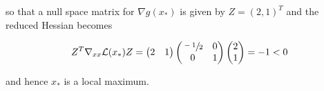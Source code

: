 \begin{solution}
    so that a null space matrix for $\nabla g(x_*)$ is given by $Z = (2, 1)^T$ and the reduced Hessian becomes

    $$
    Z^T \nabla_{xx} \mathcal{L}(x_*) Z = \begin{pmatrix*}
        2 & 1
    \end{pmatrix*} \begin{pmatrix*}
        \sfrac{-1}{2} & 0 \\
         0            & 1
    \end{pmatrix*} \begin{pmatrix*}
        2 \\
        1
    \end{pmatrix*} = -1 < 0
    $$

    and hence $x_*$ is a local maximum.
    \ \\
\end{solution}